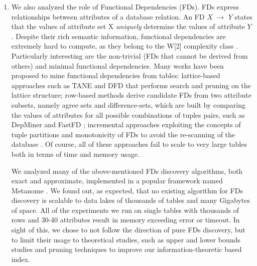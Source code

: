 \begin{enumerate}
    \item We also analyzed the role of Functional Dependencies (FDs). FDs express relationships between attributes of a database relation. An FD $X$ $\rightarrow$ $Y$ states that the values of attribute set X \textit{uniquely} determine the values of attribute $Y$. Despite their rich semantic information, functional dependencies are extremely hard to compute, as they belong to the W[2] complexity class \cite{blasius2017parameterized}. Particularly interesting are the non-trivial (FDs that cannot be derived from others) and minimal functional dependencies. Many works have been proposed to mine functional dependencies from tables: lattice-based approaches such as TANE \cite{huhtala1999tane} and DFD \cite{abedjan2014dfd} that performs search and pruning on the lattice structure; row-based methods derive candidate FDs from two attribute subsets, namely agree sets and difference-sets, which are built by comparing the values of attributes for all possible combinations of tuples pairs, such as DepMiner \cite{lopes2000efficient} and FastFD \cite{wyss2001fastfds}; incremental approaches exploiting the concepts of tuple partitions and monotonicity of FDs to avoid the re-scanning of the database \cite{wang2001incremental}. Of course, all of these approaches fail to scale to very large tables both in terms of time and memory usage. 

    We analyzed many of the above-mentioned FDs discovery algorithms, both exact and approximate, implemented in a popular framework named Metanome \cite{papenbrock2015data}. We found out, as expected, that no existing algorithm for FDs discovery is scalable to data lakes of thousands of tables and many Gigabytes of space. All of the experiments we run on single tables with thousands of rows and 30-40 attributes result in memory exceeding error or timeout. In sight of this, we chose to not follow the direction of pure FDs discovery, but to limit their usage to theoretical studies, such as upper and lower bounds studies and pruning techniques to improve our information-theoretic based index.
    

\end{enumerate}
